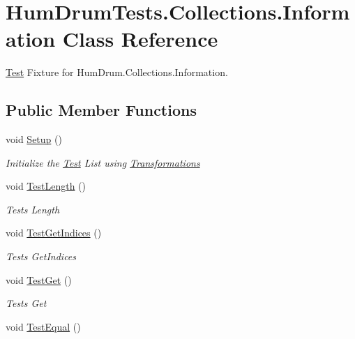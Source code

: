 \hypertarget{classHumDrumTests_1_1Collections_1_1Information}{}\section{Hum\+Drum\+Tests.\+Collections.\+Information Class Reference}
\label{classHumDrumTests_1_1Collections_1_1Information}


\hyperlink{classHumDrumTests_1_1Test}{Test} Fixture for Hum\+Drum.\+Collections.\+Information.  


\subsection*{Public Member Functions}
\begin{DoxyCompactItemize}
\item 
void \hyperlink{classHumDrumTests_1_1Collections_1_1Information_a18127bd4a65ef987c229c90d6281dd08}{Setup} ()
\begin{DoxyCompactList}\small\item\em Initialize the \hyperlink{classHumDrumTests_1_1Test}{Test} List using \hyperlink{classHumDrumTests_1_1Collections_1_1Transformations}{Transformations} \end{DoxyCompactList}\item 
void \hyperlink{classHumDrumTests_1_1Collections_1_1Information_a17fd7f7f4cfb6f6b93a6c920881c0e67}{Test\+Length} ()
\begin{DoxyCompactList}\small\item\em Tests Length \end{DoxyCompactList}\item 
void \hyperlink{classHumDrumTests_1_1Collections_1_1Information_ab10023ea742a6c7d55669521c4732f44}{Test\+Get\+Indices} ()
\begin{DoxyCompactList}\small\item\em Tests Get\+Indices \end{DoxyCompactList}\item 
void \hyperlink{classHumDrumTests_1_1Collections_1_1Information_ae07dbfd67a1d0f672abb62e9990bda43}{Test\+Get} ()
\begin{DoxyCompactList}\small\item\em Tests Get \end{DoxyCompactList}\item 
void \hyperlink{classHumDrumTests_1_1Collections_1_1Information_a8aca8bd7bcf86c773b842f23d4b8fd94}{Test\+Equal} ()

\end{DoxyCompactItemize}
